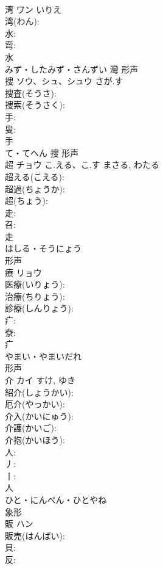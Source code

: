 \documentclass[8pt]{extreport}
\begin{document}
\begin{CJK}{UTF8}{min}
\\	湾	ワン	いりえ		
\\	湾(わん): 
\\	水: 
\\	弯: 
\\	水	
\\	みず・したみず・さんずい	灣	形声 
\\	捜	ソウ、シュ、シュウ	さが.す		
\\	捜査(そうさ): 
\\	捜索(そうさく): 
\\	手: 
\\	叟: 
\\	手	
\\	て・てへん	搜	形声 
\\	超	チョウ	こ.える、こ.す	まさる, わたる	
\\	超える(こえる): 
\\	超過(ちょうか): 
\\	超(ちょう): 
\\	走: 
\\	召: 
\\	走	
\\	はしる・そうにょう	
\\	形声 
\\	療	リョウ			
\\	医療(いりょう): 
\\	治療(ちりょう): 
\\	診療(しんりょう): 
\\	疒: 
\\	尞: 
\\	疒	
\\	やまい・やまいだれ	
\\	形声 
\\	介	カイ		すけ, ゆき	
\\	紹介(しょうかい): 
\\	厄介(やっかい): 
\\	介入(かいにゅう): 
\\	介護(かいご): 
\\	介抱(かいほう): 
\\	人: 
\\	丿: 
\\	丨: 
\\	人	
\\	ひと・にんべん・ひとやね	
\\	象形 
\\	販	ハン			
\\	販売(はんばい): 
\\	貝: 
\\	反: 

\end{CJK}
\end{document}

